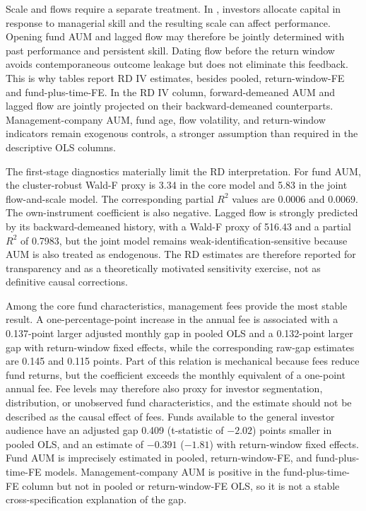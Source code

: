 \documentclass[preprint,12pt,authoryear]{elsarticle}
\begin{document}
Scale and flows require a separate treatment. In \citet{berkgreen2004}, investors allocate capital in response to managerial skill and the resulting scale can affect performance. Opening fund AUM and lagged flow may therefore be jointly determined with past performance and persistent skill. Dating flow before the return window avoids contemporaneous outcome leakage but does not eliminate this feedback. This is why tables report RD IV estimates, besides pooled, return-window-FE and fund-plus-time-FE. In the RD IV column, forward-demeaned AUM and lagged flow are jointly projected on their backward-demeaned counterparts. Management-company AUM, fund age, flow volatility, and return-window indicators remain exogenous controls, a stronger assumption than required in the descriptive OLS columns.

The first-stage diagnostics materially limit the RD interpretation. For fund AUM, the cluster-robust Wald-F proxy is 3.34 in the core model and 5.83 in the joint flow-and-scale model. The corresponding partial $R^2$ values are 0.0006 and 0.0069. The own-instrument coefficient is also negative. Lagged flow is strongly predicted by its backward-demeaned history, with a Wald-F proxy of 516.43 and a partial $R^2$ of 0.7983, but the joint model remains weak-identification-sensitive because AUM is also treated as endogenous. The RD estimates are therefore reported for transparency and as a theoretically motivated sensitivity exercise, not as definitive causal corrections.

Among the core fund characteristics, management fees provide the most stable result. A one-percentage-point increase in the annual fee is associated with a 0.137-point larger adjusted monthly gap in pooled OLS and a 0.132-point larger gap with return-window fixed effects, while the corresponding raw-gap estimates are 0.145 and 0.115 points. Part of this relation is mechanical because fees reduce fund returns, but the coefficient exceeds the monthly equivalent of a one-point annual fee. Fee levels may therefore also proxy for investor segmentation, distribution, or unobserved fund characteristics, and the estimate should not be described as the causal effect of fees. Funds available to the general investor audience have an adjusted gap 0.409 (t-statistic of $-2.02$) points smaller in pooled OLS, and an estimate of $-0.391$ ($-1.81$) with return-window fixed effects. Fund AUM is imprecisely estimated in pooled, return-window-FE, and fund-plus-time-FE models. Management-company AUM is positive in the fund-plus-time-FE column but not in pooled or return-window-FE OLS, so it is not a stable cross-specification explanation of the gap.
\end{document}
